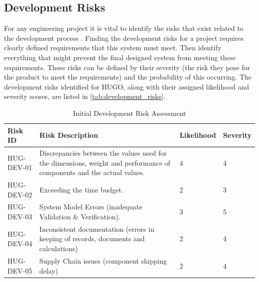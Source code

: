 \subsection{Development Risks}
For any engineering project it is vital to identify the risks that exist related to the development process \cite{Faber2003}. Finding the development risks for a project requires clearly defined requirements that this system must meet. Then identify everything that might prevent the final designed system from meeting these requirements. These risks can be defined by their severity (the risk they pose for the product to meet the requirements) and the probability of this occurring. The development risks identified for HUGO, along with their assigned likelihood and severity scores, are listed in \autoref{tab:development_risks}.

\begin{table}[H]
    \centering
      \caption{Initial Development Risk Assessment}
    \begin{tabular}{|p{3cm}|p{8cm}|p{2cm}|p{1.5cm}|}
    \hline
       \textbf{Risk ID}  & \textbf{Risk Description} & \textbf{Likelihood} & \textbf{Severity} \\ \hline \hline
        HUG-DEV-01 & Discrepancies between the values used for the dimensions, weight and performance of components and the actual values. & 4 & 4 \\ \hline
        HUG-DEV-02 & Exceeding the time budget. & 2 & 3 \\ \hline
        HUG-DEV-03 & System Model Errors (inadequate Validation \& Verification).       & 3 & 5 \\ \hline
        HUG-DEV-04 & Inconsistent documentation (errors in keeping of records, documents and calculations) & 2 & 4 \\ \hline
        HUG-DEV-05 & Supply Chain issues (component shipping delay) & 2 & 4 \\ \hline
        
    \end{tabular}
    \label{tab:development_risks}
\end{table}

